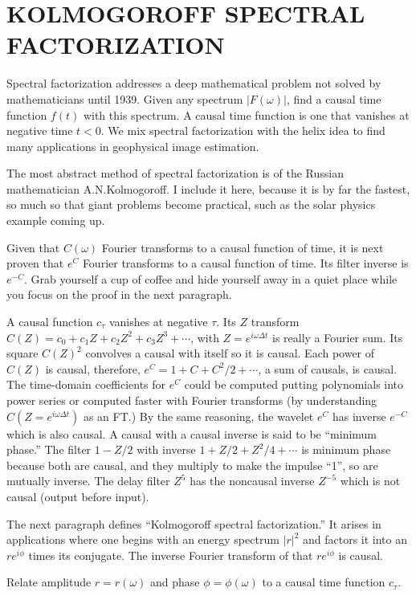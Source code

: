 \section{KOLMOGOROFF SPECTRAL FACTORIZATION}
Spectral factorization addresses a deep mathematical problem not solved
by mathematicians until 1939.
Given any spectrum $|F(\omega)|$,
find a causal time function $f(t)$ with this spectrum.
A causal time function is one that vanishes at negative time $t<0$.
We mix spectral factorization with the helix idea to find many applications
in geophysical image estimation.
\par
The most abstract method of spectral factorization is of the Russian mathematician A.N.Kolmogoroff.
I include it here, because it is by far the fastest,
so much so that giant problems become practical,
such as the solar physics example coming up.
\par
Given that $C(\omega)$ Fourier transforms to a causal function of time,
it is next proven that $e^C$ Fourier transforms to a causal function of time.
Its filter inverse is $e^{-C}$.
Grab yourself a cup of coffee
and hide yourself away in a quiet place
while you focus on the proof in the next paragraph.
\par
A causal function $c_\tau$ vanishes at negative $\tau$.
Its $Z$ transform $C(Z) = c_0 + c_1 Z + c_2 Z^2 + c_3 Z^3 +\cdots$,
with $Z=e^{i\omega\Delta t}$ is really a Fourier sum.
Its square $C(Z)^2$
convolves a causal with itself so it is causal.
Each power of $C(Z)$ is causal, therefore,
$e^C=1+C+C^2/2+\cdots$, a sum of causals, is causal.
The time-domain coefficients for $e^C$ could be computed
putting polynomials into power series or computed faster with Fourier transforms 
(by understanding $C(Z=e^{i\omega\Delta t})$ as an FT.)
By the same reasoning,
the wavelet $e^C$ has inverse $e^{-C}$ which is also causal.
A causal with a causal inverse is said to be ``minimum phase.''
The filter $1-Z/2$ with inverse $1+Z/2+Z^2/4+\cdots$ is minimum phase
because both are causal,
and they multiply to make the impulse ``1'',
so are mutually inverse.
The delay filter $Z^5$ has the noncausal inverse $Z^{-5}$ which is not causal
(output before input).
\par
The next paragraph defines ``Kolmogoroff spectral factorization.''
It arises in applications where one begins with an energy spectrum $|r|^2$
and factors it into an $r e^{i\phi}$ times its conjugate.
The inverse Fourier transform of that  $r e^{i\phi}$ is causal.
\par
Relate amplitude $r=r(\omega)$ and phase $\phi=\phi(\omega)$
to a causal time function $c_\tau$.

